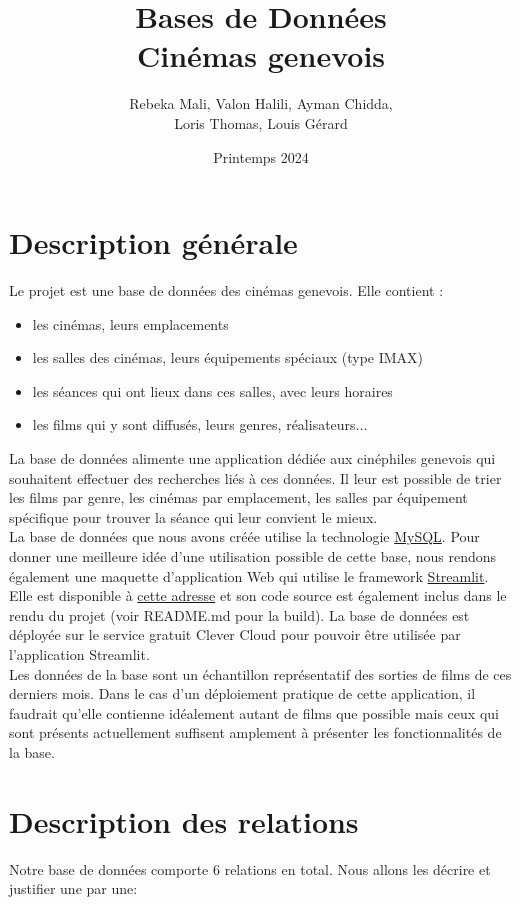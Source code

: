 \documentclass[12pt]{article}
\title{Bases de Données \\ Cinémas genevois}
\author{Rebeka Mali, Valon Halili, Ayman Chidda,\\ Loris Thomas, Louis Gérard}
\date{Printemps 2024}
\begin{document}
\maketitle
\pagebreak
\tableofcontents
\pagebreak
\section{Description générale}
Le projet est une base de données des cinémas genevois. Elle contient : 
\begin{itemize}
    \item les cinémas, leurs emplacements
    \item les salles des cinémas, leurs équipements spéciaux (type IMAX)
    \item les séances qui ont lieux dans ces salles, avec leurs horaires
    \item les films qui y sont diffusés, leurs genres, réalisateurs...
\end{itemize}
La base de données alimente une application dédiée aux cinéphiles genevois qui souhaitent
effectuer des recherches liés à ces données. Il leur est possible de trier les films par genre,
les cinémas par emplacement, les salles par équipement spécifique pour trouver la séance qui leur convient le mieux. \\
La base de données que nous avons créée utilise la technologie \href{https://www.mysql.com/}{MySQL}. Pour donner une meilleure
idée d'une utilisation possible de cette base, nous rendons également une maquette d'application Web qui utilise le framework
\href{https://streamlit.io/}{Streamlit}. Elle est disponible à \href{https://bddg7unige.streamlit.app/}{cette adresse} et son code source
est également inclus dans le rendu du projet (voir README.md pour la build). La base de données est déployée
sur le service gratuit Clever Cloud pour pouvoir être utilisée par l'application Streamlit.  \\

Les données de la base sont un échantillon représentatif des sorties de films de ces derniers mois. Dans le cas 
d'un déploiement pratique de cette application, il faudrait qu'elle contienne idéalement autant de films que possible mais
ceux qui sont présents actuellement suffisent amplement à présenter les fonctionnalités de la base.
\pagebreak
\section{Description des relations}
Notre base de données comporte 6 relations en total. Nous allons les décrire et justifier une par une: 
\end{document}
